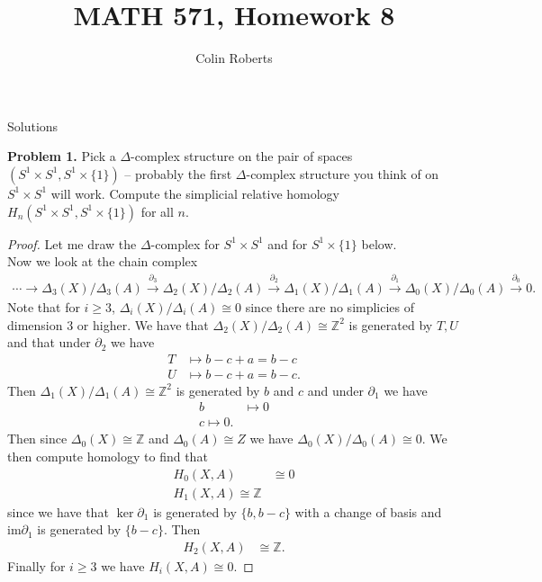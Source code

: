 \documentclass[leqno]{article}
\author{Colin Roberts}
\title{MATH 571, Homework 8}
\theoremstyle{nonumberplain}
\newtheorem{proof}{Proof}
\newcommand{\im}{\mathrm{im}}
\newcommand{\Z}{\mathbb{Z}}
\begin{document}
\maketitle
\begin{large}
\begin{center}
Solutions
\end{center}
\end{large}


\noindent\textbf{Problem 1.} 
Pick a $\Delta$-complex structure on the pair of spaces $(S^1\times S^1,S^1\times \{1\})$ -- probably the first $\Delta$-complex structure you think of on $S^1\times S^1$ will work. Compute the simplicial relative homology $H_n(S^1\times S^1,S^1\times \{1\})$ for all $n$.


\begin{proof}
Let me draw the $\Delta$-complex for $S^1\times S^1$ and for $S^1\times \{1\}$ below.
\vspace*{5cm}\\
Now we look at the chain complex
\begin{align*}
\cdots \rightarrow \Delta_3(X)/\Delta_3(A) \xrightarrow{\partial_3} \Delta_2(X)/\Delta_2(A) \xrightarrow{\partial_2} \Delta_1(X)/\Delta_1(A) \xrightarrow{\partial_1}  \Delta_0(X)/\Delta_0(A) \xrightarrow{\partial_0} 0.
\end{align*}
Note that for $i\geq 3$,  $\Delta_i(X)/\Delta_i(A)\cong 0$ since there are no simplicies of dimension $3$ or higher.  We have that $\Delta_2(X)/\Delta_2(A)\cong \Z^2$ is generated by $T,U$ and that under $\partial_2$ we have 
\begin{align*}
T&\mapsto b-c+a = b-c\\
U&\mapsto b-c+a = b-c.
\end{align*}
Then $\Delta_1(X)/\Delta_1(A)\cong \Z^2$ is generated by $b$ and $c$ and under $\partial_1$ we have
\begin{align*}
b&\mapsto 0\\
c\mapsto 0.
\end{align*}
Then since $\Delta_0(X)\cong \Z$ and $\Delta_0(A) \cong Z$ we have $\Delta_0(X)/\Delta_0(A)\cong 0$.  We then compute homology to find that 
\begin{align*}
H_0(X,A)&\cong 0\\
H_1(X,A)\cong \Z
\end{align*}
since we have that $\ker \partial_1$ is generated by $\{b,b-c\}$ with a change of basis and $\im \partial_1$ is generated by $\{b-c\}$. Then
\begin{align*}
H_2(X,A)&\cong \Z.
\end{align*}
Finally for $i\geq 3$ we have $H_i(X,A)\cong 0$.
\end{proof}
\end{document}
